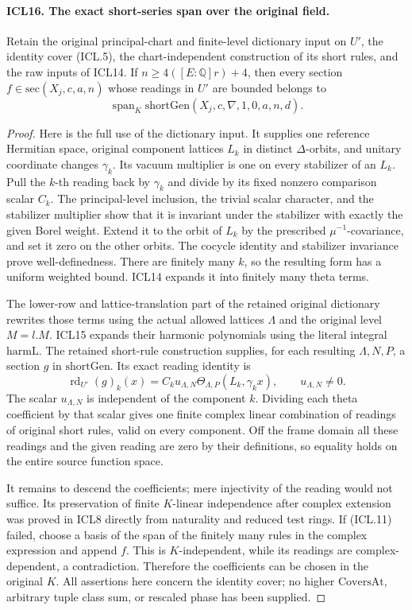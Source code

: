\documentclass[11pt,a4paper]{article}
\numberwithin{equation}{section}
\theoremstyle{remark}\newtheorem{remark}[theorem]{Remark}
\begin{document}
\paragraph{ICL16. The exact short-series span over the original field.}
\label{claim:ICL16}
Retain the original principal-chart and finite-level
dictionary input on \(U'\), the identity cover (ICL.5),
the chart-independent construction of its short rules,
and the raw inputs of ICL14.  If
\(n\geq4([E:\mathbb Q]r)+4\), then every section
\(f\in\mathrm{sec}(X_j,c,a,n)\) whose readings in
\(U'\) are bounded belongs to
\[
 \operatorname{span}_K\mathrm{shortGen}
                     (X_j,c,\nabla,1,0,a,n,d).        \tag{ICL.11}
\]
\begin{proof}
Here is the full use of the dictionary input.  It supplies
one reference Hermitian space, original component
lattices \(L_k\) in distinct \(\Delta\)-orbits, and
unitary coordinate changes \(\gamma_k\).  Its vacuum
multiplier is one on every stabilizer of an \(L_k\).
Pull the \(k\)-th reading back by \(\gamma_k\) and
divide by its fixed nonzero comparison scalar \(C_k\).
The principal-level inclusion, the trivial scalar
character, and the stabilizer multiplier show that it
is invariant under the stabilizer with exactly the
given Borel weight.  Extend it to the orbit of \(L_k\)
by the prescribed \(\mu^{-1}\)-covariance, and set it
zero on the other orbits.  The cocycle identity and
stabilizer invariance prove well-definedness.  There
are finitely many \(k\), so the resulting form has
a uniform weighted bound.  ICL14 expands it into
finitely many theta terms.

The lower-row and lattice-translation part of the
retained original dictionary rewrites those terms
using the actual allowed lattices \(\Lambda\) and
the original level \(M=l.M\).  ICL15 expands their
harmonic polynomials using the literal integral
\(\mathrm{harmL}\).  The retained short-rule
construction supplies, for each resulting \(\Lambda,N,P\),
a section \(g\) in \(\mathrm{shortGen}\).  Its exact
reading identity is
\[
 \operatorname{rd}_{U'}(g)_k(x)
   =C_k u_{\Lambda,N}
       \Theta_{\Lambda,P}(L_k,\gamma_k x),
            \qquad u_{\Lambda,N}\ne0.                 \tag{ICL.12}
\]
The scalar \(u_{\Lambda,N}\) is independent of the
component \(k\).  Dividing each theta coefficient by
that scalar gives one finite complex linear
combination of readings of original short rules,
valid on every component.  Off the frame domain all
these readings and the given reading are zero by
their definitions, so equality holds on the entire
source function space.

It remains to descend the coefficients; mere
injectivity of the reading would not suffice.  Its
preservation of finite \(K\)-linear independence
after complex extension was proved in ICL8 directly
from naturality and reduced test rings.  If (ICL.11)
failed, choose a basis of the span of the finitely
many rules in the complex expression and append
\(f\).  This is \(K\)-independent, while its readings
are complex-dependent, a contradiction.  Therefore
the coefficients can be chosen in the original
\(K\).  All assertions here concern the identity
cover; no higher \(\mathrm{CoversAt}\), arbitrary
tuple class sum, or rescaled phase has been supplied.
\end{proof}
\end{document}
